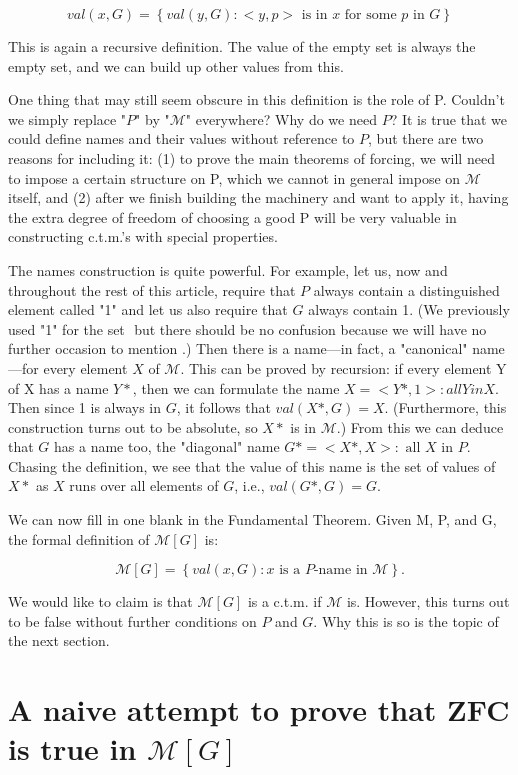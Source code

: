\documentclass[10pt]{article}
\theoremstyle{definition}
\begin{document}
$$val(x,G) =\left\{val(y,G) : <y,p>\text{ is in }x\text{ for some }p\text{ in }G\right\}$$

This is again a recursive definition.  The value of the empty set is always
the empty set, and we can build up other values from this.

One thing that may still seem obscure in this definition is the role of P.
Couldn't we simply replace "$P$" by "$\mathcal M$" everywhere?  Why do we need $P$?  It is
true that we could define names and their values without reference to $P$, but
there are two reasons for including it: (1) to prove the main theorems of
forcing, we will need to impose a certain structure on P, which we cannot in
general impose on $\mathcal{M}$ itself, and (2) after we finish building the machinery
and want to apply it, having the extra degree of freedom of choosing a good
P will be very valuable in constructing c.t.m.'s with special properties.

The names construction is quite powerful.  For example, let us, now and
throughout the rest of this article, require that $P$ always contain a
distinguished element called "1" and let us also require that $G$ always
contain 1.  (We previously used "1" for the set ${{}}$ but there should be no
confusion because we will have no further occasion to mention ${{}}$.)  Then
there is a name---in fact, a "canonical" name---for every element $X$ of $\mathcal M$.
This can be proved by recursion: if every element Y of X has a name $Y*$, then
we can formulate the name $X = {<Y*,1> : all Y in X}$.  Then since 1 is always
in $G$, it follows that $val(X*,G) = X$.  (Furthermore, this construction turns
out to be absolute, so $X*$ is in $\mathcal M$.)  From this we can deduce that $G$ has a
name too, the "diagonal" name $G* = {<X*,X> :\text{ all }X\text{ in }P}$.  Chasing the
definition, we see that the value of this name is the set of values of $X*$ as
$X$ runs over all elements of $G$, i.e., $val(G*,G) = G$.

We can now fill in one blank in the Fundamental Theorem.  Given M, P, and G,
the formal definition of $\mathcal{M}[G]$ is:

  $$\mathcal{M}[G] = \left\{val(x,G) : x\text{ is a }P\text{-name in }\mathcal M\right\}.$$

We would like to claim is that $\mathcal{M}[G]$ is a c.t.m. if $\mathcal{M}$ is.  However, this
turns out to be false without further conditions on $P$ and $G$.  Why this is so
is the topic of the next section.


\section{A naive attempt to prove that ZFC is true in $\mathcal{M}[G]$}
\end{document}
